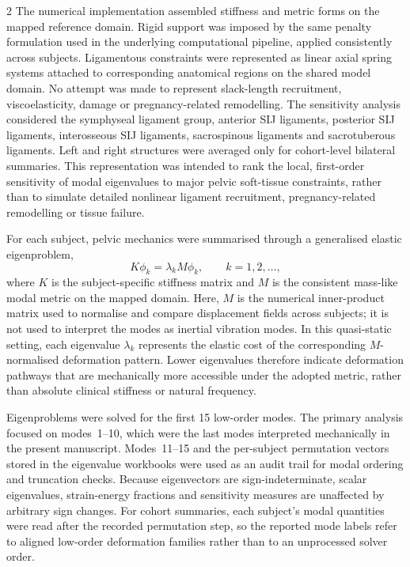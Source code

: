 \documentclass[openacc]{rsproca_new}
\begin{document}
\begin{multicols}{2}
The numerical implementation assembled stiffness and metric forms on the mapped reference domain. Rigid support was imposed by the same penalty formulation used in the underlying computational pipeline, applied consistently across subjects. Ligamentous constraints were represented as linear axial spring systems attached to corresponding anatomical regions on the shared model domain. No attempt was made to represent slack-length recruitment, viscoelasticity, damage or pregnancy-related remodelling. The sensitivity analysis considered the symphyseal ligament group, anterior SIJ ligaments, posterior SIJ ligaments, interosseous SIJ ligaments, sacrospinous ligaments and sacrotuberous ligaments. Left and right structures were averaged only for cohort-level bilateral summaries. This representation was intended to rank the local, first-order sensitivity of modal eigenvalues to major pelvic soft-tissue constraints, rather than to simulate detailed nonlinear ligament recruitment, pregnancy-related remodelling or tissue failure.

For each subject, pelvic mechanics were summarised through a generalised elastic eigenproblem,
\begin{equation}
K\phi_{k} = \lambda_{k} M\phi_{k}, \qquad k=1,2,\ldots,
\end{equation}
where $K$ is the subject-specific stiffness matrix and $M$ is the consistent mass-like modal metric on the mapped domain. Here, $M$ is the numerical inner-product matrix used to normalise and compare displacement fields across subjects; it is not used to interpret the modes as inertial vibration modes. In this quasi-static setting, each eigenvalue $\lambda_k$ represents the elastic cost of the corresponding $M$-normalised deformation pattern. Lower eigenvalues therefore indicate deformation pathways that are mechanically more accessible under the adopted metric, rather than absolute clinical stiffness or natural frequency.

Eigenproblems were solved for the first 15 low-order modes. The primary analysis focused on modes~1--10, which were the last modes interpreted mechanically in the present manuscript. Modes~11--15 and the per-subject permutation vectors stored in the eigenvalue workbooks were used as an audit trail for modal ordering and truncation checks. Because eigenvectors are sign-indeterminate, scalar eigenvalues, strain-energy fractions and sensitivity measures are unaffected by arbitrary sign changes. For cohort summaries, each subject's modal quantities were read after the recorded permutation step, so the reported mode labels refer to aligned low-order deformation families rather than to an unprocessed solver order.


\end{multicols}
\end{document}
